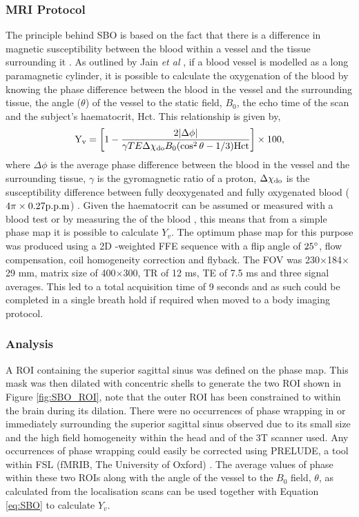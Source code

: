 \subsubsection{\ac{MRI} Protocol}
\label{sec:SBO_prot}
The principle behind \ac{SBO} is based on the fact that there is a difference in magnetic susceptibility between the blood within a vessel and the tissue surrounding it \cite{haacke_vivo_1997}. As outlined by Jain \textit{et al} \cite{jain_mri_2010}, if a blood vessel is modelled as a long paramagnetic cylinder, it is possible to calculate the oxygenation of the blood by knowing the phase difference between the blood in the vessel and the surrounding tissue, the angle ($\theta$) of the vessel to the static field, $B_0$, the echo time of the scan and the subject's haematocrit, Hct. This relationship is given by,
\begin{equation}
\textup{Y}_{\textup{v}} = \left[ 1-\frac{2|\Delta\phi|}{\gamma TE\Delta\chi_{\textup{do}}B_0(\cos^2\theta-1/3)\textup{Hct}}\right]\times 100,
\label{eq:SBO}
\end{equation}
where $\Delta\phi$ is the average phase difference between the blood in the vessel and the surrounding tissue, $\gamma$ is the gyromagnetic ratio of a proton, $\Delta\chi_{\textup{do}}$ is the susceptibility difference between fully deoxygenated and fully oxygenated blood ($4\pi\times0.27\textup{p.p.m}$) \cite{spees_water_2001, jain_investigating_2012}. Given the haematocrit can be assumed or measured with a blood test or by measuring the \tone of the blood \cite{lu_determining_2004}, this means that from a simple phase map it is possible to calculate $Y_v$. The optimum phase map for this purpose was produced using a 2D \tone-weighted \ac{FFE} sequence with a flip angle of $25\degree$, flow compensation, coil homogeneity correction and flyback. The \ac{FOV} was 230$\times$184$\times$29 mm, matrix size of 400$\times$300, \ac{TR} of 12 ms, \ac{TE} of 7.5 ms and three signal averages. This led to a total acquisition time of 9 seconds and as such could be completed in a single breath hold if required when moved to a body imaging protocol.

\subsubsection{Analysis}

A \ac{ROI} containing the superior sagittal sinus was defined on the phase map. This mask was then dilated with concentric shells to generate the two \ac{ROI} shown in Figure \ref{fig:SBO_ROI}, note that the outer \ac{ROI} has been constrained to within the brain during its dilation. There were no occurrences of phase wrapping in or immediately surrounding the superior sagittal sinus observed due to its small size and the high field homogeneity within the head and of the 3T scanner used. Any occurrences of phase wrapping could easily be corrected using \ac{PRELUDE}, a tool within \ac{FSL} (fMRIB, The University of Oxford) \cite{jenkinson_fast_2003}. The average values of phase within these two \acp{ROI} along with the angle of the vessel to the $B_0$ field, $\theta$, as calculated from the localisation scans can be used together with Equation \eqref{eq:SBO} to calculate $Y_v$.

